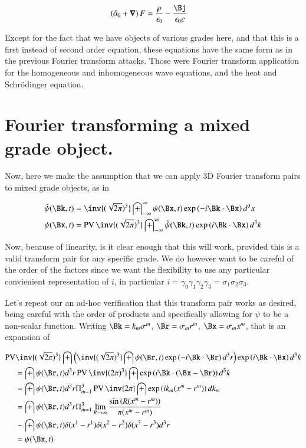 \documentclass{article}
\DeclareMathOperator{\PV}{PV}
\newcommand{\IIinf}[0]{ \int_{-\infty}^\infty }
\begin{document}
\begin{align}
\left(\partial_0 + \spacegrad\right) F &= \frac{\rho}{\epsilon_0} - \frac{\Bj}{\epsilon_0 c} 
\end{align}

Except for the fact that we have objects of various grades here, and that this is a first instead of second order equation,
these equations have the same form as in the previous Fourier transform attacks.
Those were Fourier transform application for the homogeneous and inhomogeneous wave equations, and the heat and 
Schr\"{o}dinger equation.

\section{ Fourier transforming a mixed grade object. }

Now, here we make the assumption that we can apply 3D Fourier transform pairs to mixed grade objects, as in

\begin{align}\label{eqn:FourierTxDefinition}
\hat{\psi}(\Bk, t) &= \inv{(\sqrt{2\pi})^3} \IIinf \psi(\Bx, t) \exp\left( -i \Bk \cdot \Bx \right) d^3 x \\
{\psi}(\Bx, t) &= \PV \inv{(\sqrt{2\pi})^3} \IIinf \hat{\psi}(\Bk, t) \exp\left( i \Bk \cdot \Bx \right) d^3 k
\end{align}

Now, because of linearity, is it clear enough that this will work, provided this is a valid transform pair for any specific grade.
We do however want to be careful of the order of the factors since we want the flexibility to use any particular convienient representation
of $i$, in particular $i = \gamma_0 \gamma_1 \gamma_2 \gamma_3 = \sigma_1 \sigma_2 \sigma_3$.

Let's repeat our an ad-hoc verification that this transform pair works as desired, being careful with the order of products and specifically
allowing for $\psi$ to be a non-scalar function.  
Writing $\Bk = k_m \sigma^m$, $\Br = \sigma_m r^m$, $\Bx = \sigma_m x^m$, that is an expansion of

\begin{align*}
\PV &\inv{(\sqrt{2\pi})^3} \int 
\left( \inv{(\sqrt{2\pi})^3} \int \psi(\Br, t) \exp\left( -i \Bk \cdot \Br \right) d^3 r \right)
\exp\left( i \Bk \cdot \Bx \right) d^3 k \\
&= \int \psi(\Br, t) d^3 r \PV \inv{({2\pi})^3} \int \exp\left( i \Bk \cdot (\Bx -\Br) \right) d^3 k \\
&= \int \psi(\Br, t) d^3 r \Pi_{m=1}^3 \PV \inv{{2\pi}} \int \exp\left( i k_m (x^m -r^m) \right) dk_m \\
&= \int \psi(\Br, t) d^3 r \Pi_{m=1}^3 \lim_{R\rightarrow \infty} \frac{\sin\left( R (x^m -r^m) \right)}{\pi(x^m - r^m)} \\
&\sim \int \psi(\Br, t) \delta(x^1-r^1) \delta(x^2-r^2) \delta(x^3-r^3) d^3 r \\
&= \psi(\Bx, t)
\end{align*}
\end{document}
